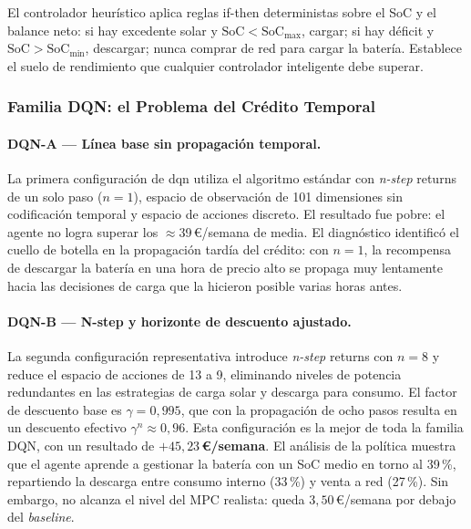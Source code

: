 \documentclass[12pt, a4paper, twoside]{report}
\begin{document}
El controlador heurístico aplica reglas if-then deterministas sobre el SoC y
el balance neto: si hay excedente solar y $\text{SoC} < \text{SoC}_{\max}$,
cargar; si hay déficit y $\text{SoC} > \text{SoC}_{\min}$, descargar; nunca
comprar de red para cargar la batería. Establece el suelo de rendimiento que
cualquier controlador inteligente debe superar.

\subsubsection{Familia DQN: el Problema del Crédito Temporal}

\paragraph{DQN-A — Línea base sin propagación temporal.}
La primera configuración de \acrshort{dqn} utiliza el algoritmo estándar con
\textit{n-step} returns de un solo paso ($n=1$), espacio de observación de
101 dimensiones sin codificación temporal y espacio de acciones discreto. El
resultado fue pobre: el agente no logra superar los $\approx$39\,€/semana de
media. El diagnóstico identificó el cuello de botella en la propagación tardía
del crédito: con $n=1$, la recompensa de descargar la batería en una hora de
precio alto se propaga muy lentamente hacia las decisiones de carga que la
hicieron posible varias horas antes.

\paragraph{DQN-B — N-step y horizonte de descuento ajustado.}
La segunda configuración representativa introduce \textit{n-step} returns con
$n=8$ y reduce el espacio de acciones de 13 a 9, eliminando niveles de potencia
redundantes en las estrategias de carga solar y descarga para consumo. El factor
de descuento base es $\gamma = 0{,}995$, que con la propagación de ocho pasos
resulta en un descuento efectivo $\gamma^n \approx 0{,}96$. Esta configuración es
la mejor de toda la familia DQN, con un resultado de
\textbf{$+45{,}23$\,€/semana}. El análisis de la política muestra que el agente
aprende a gestionar la batería con un SoC medio en torno al 39\,\%, repartiendo
la descarga entre consumo interno (33\,\%) y venta a red (27\,\%). Sin embargo,
no alcanza el nivel del MPC realista: queda $3{,}50$\,€/semana por debajo del
\textit{baseline}.
\end{document}
